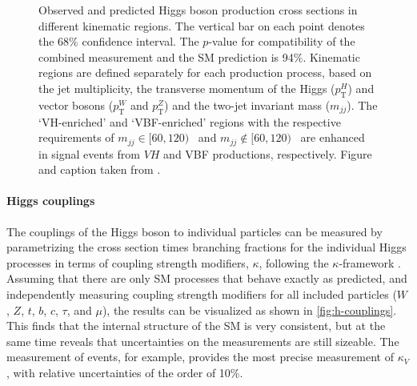 \begin{figure}
  \caption{Observed and predicted Higgs boson production cross sections in different
  kinematic regions. The vertical bar on each point denotes the 68\% confidence interval. The $p$-value for compatibility of the combined measurement and the SM prediction is 94\%. Kinematic regions are defined separately for each production process, based on the jet multiplicity, the transverse momentum of the Higgs ($p_{\textrm{T}}^H$) and vector bosons ($p_{\textrm{T}}^W$ and $p_{\textrm{T}}^Z$) and the two-jet invariant mass ($m_{jj}$).
The `VH-enriched' and `VBF-enriched' regions with the respective requirements of $m_{jj}\in[60, 120)$ \GeV\ and $m_{jj}\notin[60,120)$ \GeV\ are enhanced in signal events from $VH$ and VBF productions, respectively. Figure and caption taken from .
  }
  \label{fig:stxs-stage12}
\end{figure}


\paragraph{Higgs couplings}
The couplings of the Higgs boson to individual particles can be measured by parametrizing the cross section times branching fractions for the individual Higgs processes in terms of coupling strength modifiers, $\kappa$, following the $\kappa$-framework \cite{LHCHandbookV3}. 
Assuming that there are only SM processes that behave exactly as predicted, and independently measuring coupling strength modifiers for all included particles ($W$, $Z$, $t$, $b$, $c$, $\tau$, and $\mu$), the results can be visualized as shown in \cref{fig:h-couplings}. 
This finds that the internal structure of the SM is very consistent, but at the same time reveals that uncertainties on the measurements are still sizeable. 
The measurement of \HWW events, for example, provides the most precise measurement of $\kappa_{V}$, with relative uncertainties of the order of 10\%.

